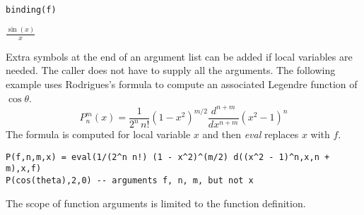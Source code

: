 \begin{Verbatim}[formatcom=\color{blue}]
binding(f)
\end{Verbatim}

\noindent
$\displaystyle \frac{\sin(x)}{x}$

\bigskip
\noindent
Extra symbols at the end of an argument list can be added if local variables are needed.
The caller does not have to supply all the arguments.
The following example uses Rodrigues's formula to
compute an associated Legendre function of $\cos\theta$.
\begin{equation*}
P_n^m(x)=\frac{1}{2^n\,n!}(1-x^2)^{m/2}\frac{d^{n+m}}{dx^{n+m}}(x^2-1)^n
\end{equation*}
The formula is computed for local variable $x$ and then
{\it eval} replaces $x$ with $f$.

\begin{Verbatim}[formatcom=\color{blue}]
P(f,n,m,x) = eval(1/(2^n n!) (1 - x^2)^(m/2) d((x^2 - 1)^n,x,n + m),x,f)
P(cos(theta),2,0) -- arguments f, n, m, but not x
\end{Verbatim}

\bigskip
\noindent
The scope of function arguments is limited to the function definition.
